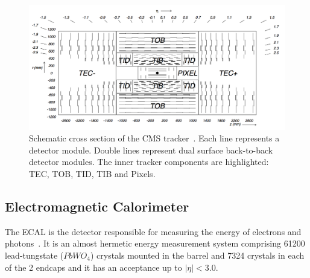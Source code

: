 \begin{figure}[!htb]
  \centering
  \includegraphics[width=1.0\textwidth]{Chapter02/CMS/Images/CMS_Tracker_Layout.png}
  \caption[Schematic cross section of the CMS tracker. The inner tracker components are highlighted: TEC, TOB, TID, TIB and Pixels.]
  {Schematic cross section of the CMS tracker~\cite{ARTICLE:TheCMSExperiment}. Each line represents a detector module. Double lines represent dual surface back-to-back detector modules. The inner tracker components are highlighted: \gls{TEC}, \gls{TOB}, \gls{TID}, \gls{TIB} and Pixels.}
  \label{FIGURE:ExperimentalApparatus_CMS_Tracker_Layout}
\end{figure}

\subsection{Electromagnetic Calorimeter}
\label{SUBSECTION:ExperimentalApparatus_CMS_ECAL}


The \gls{ECAL} is the detector responsible for measuring the energy of electrons and photons~\cite{CMSTDR:CMSECAL,CMSTDR:CMSECALAddendum}. It is an almost hermetic energy measurement system comprising 61200 lead-tungstate ($PbWO_4$) crystals mounted in the barrel and 7324 crystals in each of the 2 endcaps and it has an acceptance up to $|\eta|<3.0$.

